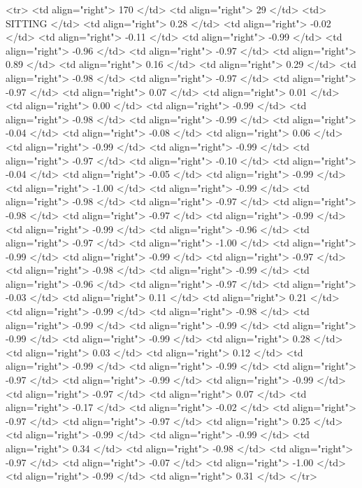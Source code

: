  <tr> <td align="right"> 170 </td> <td align="right">  29 </td> <td> SITTING </td> <td align="right"> 0.28 </td> <td align="right"> -0.02 </td> <td align="right"> -0.11 </td> <td align="right"> -0.99 </td> <td align="right"> -0.96 </td> <td align="right"> -0.97 </td> <td align="right"> 0.89 </td> <td align="right"> 0.16 </td> <td align="right"> 0.29 </td> <td align="right"> -0.98 </td> <td align="right"> -0.97 </td> <td align="right"> -0.97 </td> <td align="right"> 0.07 </td> <td align="right"> 0.01 </td> <td align="right"> 0.00 </td> <td align="right"> -0.99 </td> <td align="right"> -0.98 </td> <td align="right"> -0.99 </td> <td align="right"> -0.04 </td> <td align="right"> -0.08 </td> <td align="right"> 0.06 </td> <td align="right"> -0.99 </td> <td align="right"> -0.99 </td> <td align="right"> -0.97 </td> <td align="right"> -0.10 </td> <td align="right"> -0.04 </td> <td align="right"> -0.05 </td> <td align="right"> -0.99 </td> <td align="right"> -1.00 </td> <td align="right"> -0.99 </td> <td align="right"> -0.98 </td> <td align="right"> -0.97 </td> <td align="right"> -0.98 </td> <td align="right"> -0.97 </td> <td align="right"> -0.99 </td> <td align="right"> -0.99 </td> <td align="right"> -0.96 </td> <td align="right"> -0.97 </td> <td align="right"> -1.00 </td> <td align="right"> -0.99 </td> <td align="right"> -0.99 </td> <td align="right"> -0.97 </td> <td align="right"> -0.98 </td> <td align="right"> -0.99 </td> <td align="right"> -0.96 </td> <td align="right"> -0.97 </td> <td align="right"> -0.03 </td> <td align="right"> 0.11 </td> <td align="right"> 0.21 </td> <td align="right"> -0.99 </td> <td align="right"> -0.98 </td> <td align="right"> -0.99 </td> <td align="right"> -0.99 </td> <td align="right"> -0.99 </td> <td align="right"> -0.99 </td> <td align="right"> 0.28 </td> <td align="right"> 0.03 </td> <td align="right"> 0.12 </td> <td align="right"> -0.99 </td> <td align="right"> -0.99 </td> <td align="right"> -0.97 </td> <td align="right"> -0.99 </td> <td align="right"> -0.99 </td> <td align="right"> -0.97 </td> <td align="right"> 0.07 </td> <td align="right"> -0.17 </td> <td align="right"> -0.02 </td> <td align="right"> -0.97 </td> <td align="right"> -0.97 </td> <td align="right"> 0.25 </td> <td align="right"> -0.99 </td> <td align="right"> -0.99 </td> <td align="right"> 0.34 </td> <td align="right"> -0.98 </td> <td align="right"> -0.97 </td> <td align="right"> -0.07 </td> <td align="right"> -1.00 </td> <td align="right"> -0.99 </td> <td align="right"> 0.31 </td> </tr>
